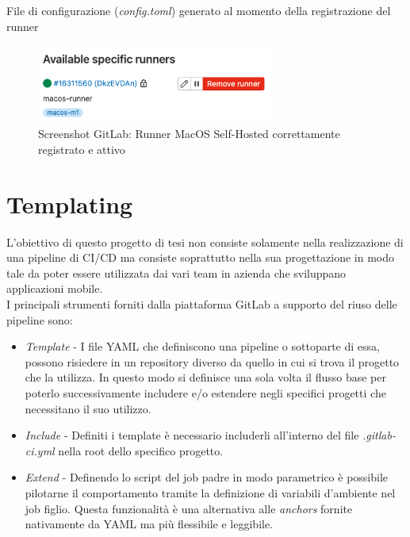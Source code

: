 \begin{listing}[H]
\inputminted{toml}{code/4-macos-runner-config}
\caption{File di configurazione (\textit{config.toml}) generato al momento della registrazione del runner}
\end{listing}

\begin{figure}[H]
\centering
\includegraphics[width=0.7\textwidth]{img/Screenshot 2022-07-07 at 11.40.13.png}
\caption{Screenshot GitLab: Runner MacOS Self-Hosted correttamente registrato e attivo}
\end{figure}

\section{Templating}
L'obiettivo di questo progetto di tesi non consiste solamente nella realizzazione di una pipeline di CI/CD ma consiste soprattutto nella sua progettazione in modo tale da poter essere utilizzata dai vari team in azienda che sviluppano applicazioni mobile.\\
I principali strumenti forniti dalla piattaforma GitLab a supporto del riuso delle pipeline sono:
\begin{itemize}
    \item \textit{Template} - I file YAML che definiscono una pipeline o sottoparte di essa, possono risiedere in un repository diverso da quello in cui si trova il progetto che la utilizza. In questo modo si definisce una sola volta il flusso base per poterlo successivamente includere e/o estendere negli specifici progetti che necessitano il suo utilizzo.
    \item \textit{Include} - Definiti i template è necessario includerli all'interno del file \textit{.gitlab-ci.yml} nella root dello specifico progetto.
    \item \textit{Extend} - Definendo lo script del job padre in modo parametrico è possibile pilotarne il comportamento tramite la definizione di variabili d'ambiente nel job figlio. Questa funzionalità è una alternativa alle \textit{anchors} fornite nativamente da YAML ma più flessibile e leggibile. 
\end{itemize}

